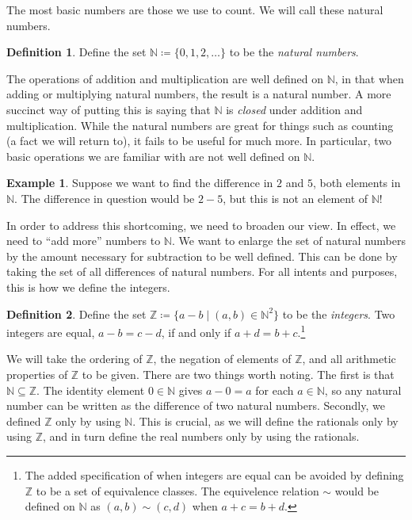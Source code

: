 \documentclass{article}
\newcommand{\N}{\mathbb{N}}
\newcommand{\Z}{\mathbb{Z}}
\theoremstyle{definition}
\newtheorem{definition}{Definition}[section]
\newtheorem{example}{Example}[section]
\begin{document}
	The most basic numbers are those we use to count. We will call these natural numbers. \begin{definition}
		Define the set $ \N\coloneqq\{0,1,2,\ldots\} $ to be the \textit{{\color{red} natural numbers}}. 
	\end{definition}
	\noindent The operations of addition and multiplication are well defined on $ \N $, in that when adding or multiplying natural numbers, the result is a natural number. A more succinct way of putting this is saying that $ \N $ is \textit{closed} under addition and multiplication. While the natural numbers are great for things such as counting (a fact we will return to), it fails to be useful for much more. In particular, two basic operations we are familiar with are not well defined on $ \N $.
	\begin{example}
		Suppose we want to find the difference in $ 2 $ and $ 5 $, both elements in $ \N $. The difference in question would be $ 2-5 $, but this is not an element of $ \N $! 
	\end{example}
	
	In order to address this shortcoming, we need to broaden our view. In effect, we need to ``add more'' numbers to $ \N $. We want to enlarge the set of natural numbers by the amount necessary for subtraction to be well defined. This can be done by taking the set of all differences of natural numbers. For all intents and purposes, this is how we define the integers. 
	\begin{definition}
		Define the set $ \Z\coloneqq\{a-b\mid(a,b)\in\N^2\} $ to be the \textit{\color{red}integers}. Two integers are equal, $ a-b=c-d $, if and only if $ a+d=b+c $.\footnote{The added specification of when integers are equal can be avoided by defining $ \Z $ to be a set of equivalence classes. The equivelence relation $ \sim $ would be defined on $ \N $ as $ (a,b)\sim(c,d) $ when $ a+c=b+d $.}  
	\end{definition}
	\noindent We will take the ordering of $ \Z $, the negation of elements of $ \Z $, and all arithmetic properties of $ \Z $ to be given. There are two things worth noting. The first is that $ \N\subseteq\Z $. The identity element $ 0\in\N $ gives $ a-0=a $ for each $ a\in\N $, so any natural number can be written as the difference of two natural numbers. Secondly, we defined $ \Z $ only by using $ \N $. This is crucial, as we will define the rationals only by using $ \Z $, and in turn define the real numbers only by using the rationals.
	
\end{document}
